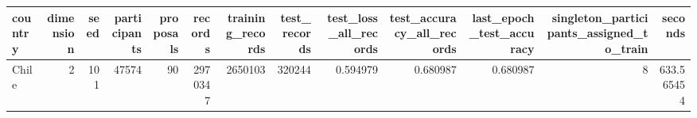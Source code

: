 \begin{tabular}{lrrrrrrrrrrrr}
\toprule
country & dimension & seed & participants & proposals & records & training_records & test_records & test_loss_all_records & test_accuracy_all_records & last_epoch_test_accuracy & singleton_participants_assigned_to_train & seconds \\
\midrule
Chile & 2 & 101 & 47574 & 90 & 2970347 & 2650103 & 320244 & 0.594979 & 0.680987 & 0.680987 & 8 & 633.565454 \\
\bottomrule
\end{tabular}
